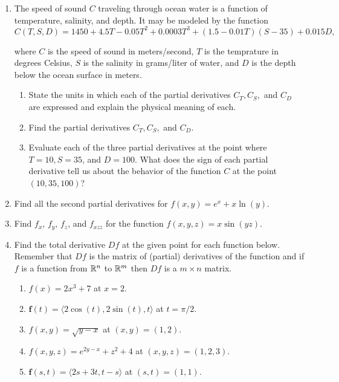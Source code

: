 {\begin{enumerate}
	\item The speed of sound $C$ traveling through ocean water is a function of 
	temperature, salinity, and depth.  It may be modeled by the function	
	\[C(T,S,D)=1450 +4.5T-0.05T^2+0.0003T^3+(1.5-0.01T)(S-35)+0.015D, \]
	
	where $C$ is the speed of sound in meters/second, $T$ is the temprature in degrees Celsius, $S$ is the salinity in grams/liter of water, and $D$ is the depth below the ocean surface in meters.
	
	\begin{enumerate}
		\item State the units in which each of the partial derivatives $C_T,C_S,$ and $C_D$ are expressed and explain the physical meaning of each.
		
		\item Find the partial derivatives $C_T, C_S,$ and $C_D$.
		
		\item Evaluate each of the three partial derivatives at the point where $T=10, S=35$, and $D=100$.  What does the sign of each partial derivative tell us about the behavior of the function $C$ at the point $(10,35,100)$?
	\end{enumerate}

%		
%		
	
	\item Find all the second partial derivatives for $f(x,y)=e^x+x\ln (y).$
	
	\item Find $f_x$, $f_y$, $f_z$, and $f_{xzz}$ for the function $f(x,y,z)=x\sin(yz)$.
	
	\pagebreak
	
	\item Find the total derivative $Df$ at the given point for each function below. Remember that $Df$ is the matrix of (partial) derivatives of the function and if $f$ is a function from $\mathbb{R}^n$ to $\mathbb{R}^m$ then $Df$ is a $m\times n$ matrix.
	\begin{enumerate}
		\item $f(x)=2x^3+7$ at $x=2$.
		\item $\mathbf{f}(t)=\langle 2\cos(t), 2 \sin(t), t\rangle$ at $t=\pi/2$.
		\item $f(x,y)=\sqrt{y-x}$ at $(x,y)=(1,2)$.
		\item $f(x,y,z)=e^{2y-x}+z^2+4$ at $(x,y,z)=(1,2,3)$.
		\item $\mathbf{f}(s,t) = \langle 2s+3t, t-s\rangle$ at $(s,t)=(1,1)$.  
	

\end{enumerate}
\end{enumerate}}
